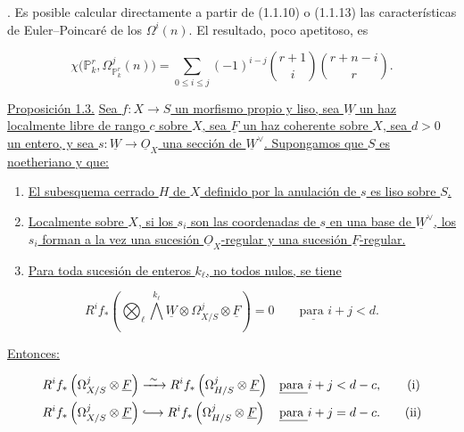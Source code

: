 \medskip
{}. Es posible calcular directamente a partir de (1.1.10) o
(1.1.13) las características de Euler--Poincaré de los $\Omega^i(n)$. El
resultado, poco apetitoso, es

\begin{equation*}
\chi\bigl(\mathbb P^r_k,\Omega^j_{\mathbb P^r_k}(n)\bigr)
=\sum_{0\leq i\leq j}(-1)^{i-j}
\binom{r+1}{i}\binom{r+n-i}{r}.
\end{equation*}

\pageoriginale

\medskip
\noindent\underline{Proposición 1.3.}\quad
\underline{Sea $f:X\to S$ un morfismo propio y liso, sea $\underline W$ un
haz localmente libre de rango $c$ sobre $X$, sea $\underline F$ un haz
coherente sobre $X$, sea $d>0$ un entero, y sea
$s:\underline W\to\underline O_X$ una sección de $\underline W^\vee$.
Supongamos que $S$ es noetheriano y que:}

\begin{enumerate}[label=(\alph*),leftmargin=2.4em]
\item \underline{El subesquema cerrado $H$ de $X$ definido por la anulación
de $s$ es liso sobre $S$.}

\item \underline{Localmente sobre $X$, si los $s_i$ son las coordenadas de
$s$ en una base de $\underline W^\vee$, los $s_i$ forman a la vez una
sucesión $\underline O_X$-regular y una sucesión
$\underline F$-regular.}

\item \underline{Para toda sucesión de enteros $k_\ell$, no todos nulos, se
tiene}
\end{enumerate}

\begin{equation*}
R^if_*\left(\bigotimes_\ell\bigwedge^{k_\ell}\underline W
\otimes\Omega^j_{X/S}\otimes\underline F\right)=0
\qquad\underline{\text{para }}i+j<d.
\end{equation*}

\underline{Entonces:}

\begin{align*}
R^if_*\left(\Omega^j_{\sisi{H}{X}/S}\otimes\underline F\right)
&\xrightarrow{\ \sim\ }
R^if_*\left(\Omega^j_{\sisi{X}{H}/S}\otimes\underline F\right)
&&\underline{\text{para }}i+j<d-c, \tag{i}\\
R^if_*\left(\Omega^j_{\sisi{H}{X}/S}\otimes\underline F\right)
&\lhook\joinrel\longrightarrow
R^if_*\left(\Omega^j_{\sisi{X}{H}/S}\otimes\underline F\right)
&&\underline{\text{para }}i+j=d-c. \tag{ii}
\end{align*}

